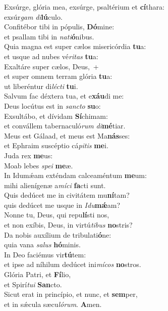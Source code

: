 \evenverse Exsúrge, glória mea, exsúrge, psaltérium et \textbf{cí}thara:~\*\\
\evenverse exsúr\textit{gam} \textit{di}\textbf{lú}culo.\\
\oddverse Confitébor tibi in pópulis, \textbf{Dó}mine:~\*\\
\oddverse et psallam tibi in \textit{na}\textit{ti}\textbf{ó}nibus.\\
\evenverse Quia magna est super cælos misericórdia \textbf{tu}a:~\*\\
\evenverse et usque ad nubes vé\textit{ri}\textit{tas} \textbf{tu}a:\\
\oddverse Exaltáre super cælos, Deus,~+\\
\oddverse  et super omnem terram glória \textbf{tu}a:~\*\\
\oddverse ut liberéntur di\textit{lé}\textit{cti} \textbf{tu}i.\\
\evenverse Salvum fac déxtera tua, et e\textbf{xáu}di me:~\*\\
\evenverse Deus locútus est in \textit{san}\textit{cto} \textbf{su}o:\\
\oddverse Exsultábo, et dívidam \textbf{Sí}chimam:~\*\\
\oddverse et convállem tabernaculó\textit{rum} \textit{di}\textbf{mé}tiar.\\
\evenverse Meus est Gálaad, et meus est Ma\textbf{nás}ses:~\*\\
\evenverse et Ephraim suscéptio cá\textit{pi}\textit{tis} \textbf{me}i.\\
\oddverse Juda rex \textbf{me}us:~\*\\
\oddverse Moab lebes \textit{spe}\textit{i} \textbf{me}æ.\\
\evenverse In Idumǽam exténdam calceaméntum \textbf{me}um:~\*\\
\evenverse mihi alienígenæ a\textit{mí}\textit{ci} \textbf{fa}cti sunt.\\
\oddverse Quis dedúcet me in civitátem mu\textbf{ní}tam?~\*\\
\oddverse quis dedúcet me usque in \textit{I}\textit{du}\textbf{mǽ}am?\\
\evenverse Nonne tu, Deus, qui repu\textbf{lí}sti nos,~\*\\
\evenverse et non exíbis, Deus, in virtú\textit{ti}\textit{bus} \textbf{no}stris?\\
\oddverse Da nobis auxílium de tribulati\textbf{ó}ne:~\*\\
\oddverse quia vana \textit{sa}\textit{lus} \textbf{hó}minis.\\
\evenverse In Deo faciémus vir\textbf{tú}tem:~\*\\
\evenverse et ipse ad níhilum dedúcet ini\textit{mí}\textit{cos} \textbf{no}stros.\\
\oddverse Glória Patri, et \textbf{Fí}lio,~\*\\
\oddverse et Spirí\textit{tu}\textit{i} \textbf{San}cto.\\
\evenverse Sicut erat in princípio, et nunc, et \textbf{sem}per,~\*\\
\evenverse et in sǽcula sæcu\textit{ló}\textit{rum}. \textbf{A}men.\\
